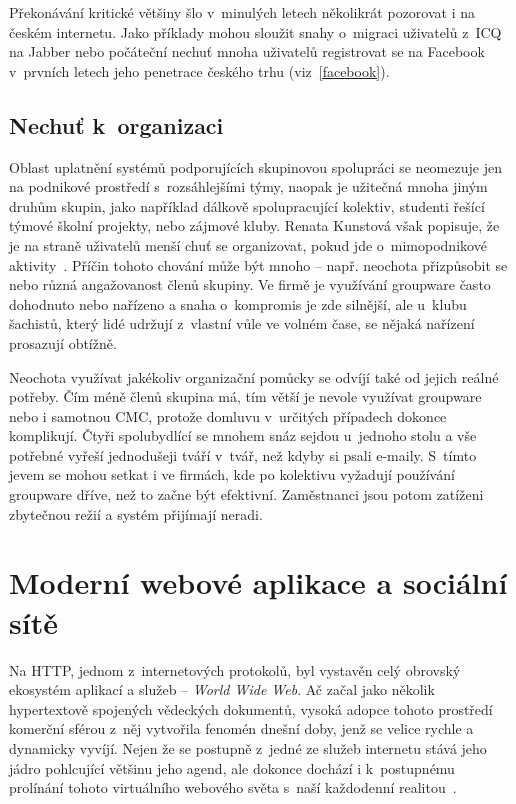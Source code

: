 \documentclass[12pt,oneside,final]{fithesis2}
\begin{document}
Překonávání kritické většiny šlo v~minulých letech několikrát pozorovat i na českém internetu. Jako příklady mohou sloužit snahy o~migraci uživatelů z~ICQ na Jabber nebo počáteční nechuť mnoha uživatelů registrovat se na Fa\-ce\-book v~prvních letech jeho penetrace českého trhu (viz~\ref{facebook}).

\subsection{Nechuť k~organizaci}\label{noOrganization}
Oblast uplatnění systémů podporujících skupinovou spolupráci se neomezuje jen na podnikové prostředí s~rozsáhlejšími týmy, naopak je užitečná mnoha jiným druhům skupin, jako například dálkově spolupracující kolektiv, studenti řešící týmové školní projekty, nebo zájmové kluby. Renata Kunstová však popisuje, že je na straně uživatelů menší chuť se organizovat, pokud jde o~mimopodnikové aktivity~\cite{kunstova1999skupinova}. Příčin tohoto chování může být mnoho -- např. neochota přizpůsobit se nebo různá angažovanost členů skupiny. Ve firmě je využívání groupware často dohodnuto nebo nařízeno a snaha o~kompromis je zde silnější, ale u~klubu šachistů, který lidé udržují z~vlastní vůle ve volném čase, se nějaká nařízení prosazují obtížně.

Neochota využívat jakékoliv organizační pomůcky se odvíjí také od jejich reálné potřeby. Čím méně členů skupina má, tím větší je nevole využívat groupware nebo i samotnou CMC, protože domluvu v~určitých případech dokonce komplikují. Čtyři spolubydlící se mnohem snáz sejdou u~jednoho stolu a vše potřebné vyřeší jednodušeji tváří v~tvář, než kdyby si psali e-maily. S~tímto jevem se mohou setkat i ve firmách, kde po kolektivu vyžadují používání groupware dříve, než to začne být efektivní. Zaměstnanci jsou potom zatíženi zbytečnou režií a systém přijímají neradi.


\section{Moderní webové aplikace a sociální sítě}\label{web}
Na HTTP, jednom z~internetových protokolů, byl vystavěn celý obrovský ekosystém aplikací a služeb -- \emph{World Wide Web}. Ač začal jako několik hypertextově spojených vědeckých dokumentů, vysoká adopce tohoto prostředí komerční sférou z~něj vytvořila fenomén dnešní doby, jenž se velice rychle a dynamicky vyvíjí. Nejen že se postupně z~jedné ze služeb internetu stává jeho jádro pohlcující většinu jeho agend, ale dokonce dochází i k~postupnému prolínání tohoto virtuálního webového světa s~naší každodenní realitou~\cite{thurlow2004computer}.
\end{document}
